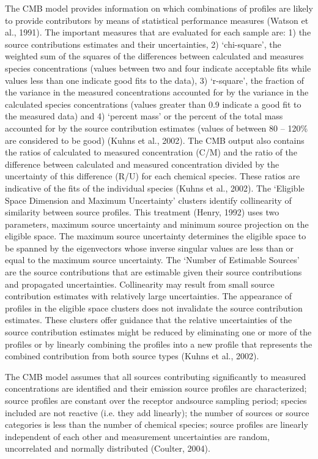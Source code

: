 \documentclass{nwureport}
\begin{document}
The CMB model provides information on which combinations of profiles are likely to provide contributors by
means of statistical performance measures (Watson et al., 1991). The important measures that are
evaluated for each sample are: 1) the source contributions estimates and their uncertainties, 2) ‘chi-square’,
the weighted sum of the squares of the differences between calculated and measures species
concentrations (values between two and four indicate acceptable fits while values less than one indicate
good fits to the data), 3) ‘r-square’, the fraction of the variance in the measured concentrations accounted for
by the variance in the calculated species concentrations (values greater than 0.9 indicate a good fit to the
measured data) and 4) ‘percent mass’ or the percent of the total mass accounted for by the source
contribution estimates (values of between 80 – 120\% are considered to be good) (Kuhns et al., 2002).
The CMB output also contains the ratios of calculated to measured concentration (C/M) and the ratio of the
difference between calculated and measured concentration divided by the uncertainty of this difference (R/U)
for each chemical species. These ratios are indicative of the fits of the individual species (Kuhns et al.,
2002). The ‘Eligible Space Dimension and Maximum Uncertainty’ clusters identify collinearity of similarity
between source profiles. This treatment (Henry, 1992) uses two parameters, maximum source uncertainty
and minimum source projection on the eligible space. The maximum source uncertainty determines the
eligible space to be spanned by the eigenvectors whose inverse singular values are less than or equal to the
maximum source uncertainty. The ‘Number of Estimable Sources’ are the source contributions that are
estimable given their source contributions and propagated uncertainties. Collinearity may result from small
source contribution estimates with relatively large uncertainties. The appearance of profiles in the eligible
space clusters does not invalidate the source contribution estimates. These clusters offer guidance that the
relative uncertainties of the source contribution estimates might be reduced by eliminating one or more of the
profiles or by linearly combining the profiles into a new profile that represents the combined contribution from
both source types (Kuhns et al., 2002).

The CMB model assumes that all sources contributing significantly to measured concentrations are identified
and their emission source profiles are characterized; source profiles are constant over the receptor andsource sampling period; species included are not reactive (i.e. they add linearly); the number of sources or
source categories is less than the number of chemical species; source profiles are linearly independent of
each other and measurement uncertainties are random, uncorrelated and normally distributed (Coulter,
2004).
\end{document}
